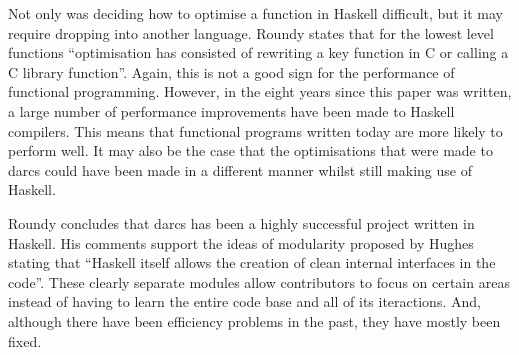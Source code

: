 Not only was deciding how to optimise a function in Haskell difficult, but it
may require dropping into another language. Roundy states that for the lowest
level functions ``optimisation has consisted of rewriting a key function in C
or calling a C library function''. Again, this is not a good sign for the performance
of functional programming. However, in the eight years since this paper was
written, a large number of performance improvements have been made to Haskell
compilers. This means that functional programs written today are more likely
to perform well. It may also be the case that the optimisations that were made
to darcs could have been made in a different manner whilst still making use of
Haskell.

Roundy concludes that darcs has been a highly successful project written in
Haskell. His comments support the ideas of modularity proposed by Hughes stating
that ``Haskell itself allows the creation of clean internal interfaces in the
code''. These clearly separate modules allow contributors to focus on certain
areas instead of having to learn the entire code base and all of its iteractions.
And, although there have been efficiency problems in the past, they have mostly
been fixed.
